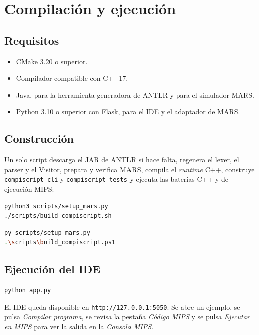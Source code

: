 \documentclass[11pt,a4paper]{article}
\begin{document}
\section{Compilación y ejecución}

\subsection{Requisitos}

\begin{itemize}[leftmargin=1.4em]
  \item CMake 3.20 o superior.
  \item Compilador compatible con C++17.
  \item Java, para la herramienta generadora de ANTLR y para el simulador MARS.
  \item Python 3.10 o superior con Flask, para el IDE y el adaptador de MARS.
\end{itemize}

\subsection{Construcción}

Un solo script descarga el JAR de ANTLR si hace falta, regenera el lexer, el
parser y el Visitor, prepara y verifica MARS, compila el \emph{runtime} C++,
construye \texttt{compiscript\_cli} y \texttt{compiscript\_tests} y ejecuta las
baterías C++ y de ejecución MIPS:

\begin{lstlisting}[language=bash,caption={macOS o Linux.}]
python3 scripts/setup_mars.py
./scripts/build_compiscript.sh
\end{lstlisting}

\begin{lstlisting}[language=bash,caption={Windows PowerShell.}]
py scripts/setup_mars.py
.\scripts\build_compiscript.ps1
\end{lstlisting}

\subsection{Ejecución del IDE}

\begin{lstlisting}[language=bash,caption={Servidor del IDE.}]
python app.py
\end{lstlisting}

El IDE queda disponible en \texttt{http://127.0.0.1:5050}. Se abre un ejemplo,
se pulsa \emph{Compilar programa}, se revisa la pestaña \emph{Código MIPS} y se
pulsa \emph{Ejecutar en MIPS} para ver la salida en la \emph{Consola MIPS}.
\end{document}
